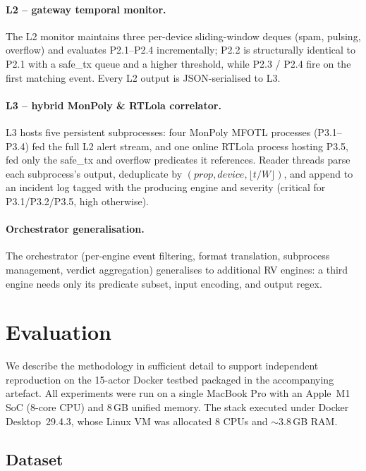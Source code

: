 \documentclass[runningheads]{llncs}
\begin{document}
\paragraph{L2 -- gateway temporal monitor.}
The L2 monitor maintains three per-device sliding-window deques
(spam, pulsing, overflow) and evaluates P2.1--P2.4 incrementally;
P2.2 is structurally identical to P2.1 with a \textsf{safe\_tx}
queue and a higher threshold, while P2.3 / P2.4 fire on the first
matching event.  Every L2 output is JSON-serialised to L3.

\paragraph{L3 -- hybrid MonPoly \& RTLola correlator.}
L3 hosts five persistent subprocesses: four MonPoly MFOTL
processes (P3.1--P3.4) fed the full L2 alert stream, and one
online RTLola process hosting P3.5, fed only the \textsf{safe\_tx}
and \textsf{overflow} predicates it references.  Reader threads
parse each subprocess's output, deduplicate by
$(\textit{prop},\textit{device},\lfloor t/W \rfloor)$, and append
to an incident log tagged with the producing engine and severity
({\sc critical} for P3.1/P3.2/P3.5, {\sc high} otherwise).

\paragraph{Orchestrator generalisation.}
The orchestrator (per-engine event filtering, format translation,
subprocess management, verdict aggregation) generalises to
additional RV engines: a third engine needs only its predicate
subset, input encoding, and output regex.  

\section{Evaluation}
\label{sec:eval}

We describe the methodology in sufficient detail to support independent
reproduction on the 15-actor Docker testbed packaged in the
accompanying artefact.
All experiments were run on a single MacBook Pro with an Apple~M1 SoC
(8-core CPU) and 8\,GB unified memory. The stack executed under Docker Desktop~29.4.3, whose Linux VM was allocated 8 CPUs and ${\sim}3.8$\,GB RAM.

\subsection{Dataset}
\label{sec:eval:data}
\end{document}
